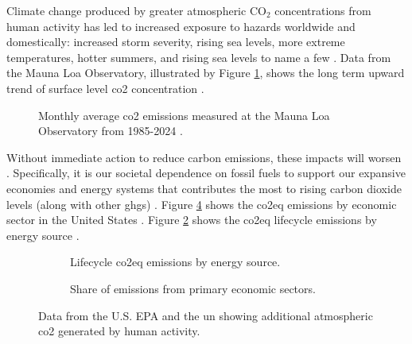Climate change produced by greater atmospheric CO$_2$ concentrations
\cite{kane_atmospheric_1996} from human activity has led to increased exposure
to hazards worldwide and domestically: increased storm severity, rising sea
levels, more extreme temperatures, hotter summers, and rising sea levels to name
a few \cite{reidmiller_fourth_2018}. Data from the Mauna Loa Observatory,
illustrated by Figure \ref{fig:mauna-loa-co2}, shows the long term upward trend
of surface level \ac{co2} concentration \cite{kane_atmospheric_1996}.
\begin{figure}[ht!]
    \centering
    \resizebox{0.9\columnwidth}{!}{}
    \caption{Monthly average \ac{co2} emissions measured at the Mauna Loa
    Observatory from 1985-2024 \cite{kane_atmospheric_1996}.}
    \label{fig:mauna-loa-co2}
\end{figure}

Without immediate action to reduce carbon emissions, these impacts will worsen
\cite{intergovernmental_panel_on_climate_change_climate_2014}. Specifically, it
is our societal dependence on fossil fuels to support our expansive economies
and energy systems that contributes the most to rising carbon dioxide levels
(along with other \acp{ghg}) \cite{epa_inventory_2023}. Figure
\ref{fig:emissions-by-sector} shows the \ac{co2eq} emissions by economic sector
in the United States \cite{epa_inventory_2023}. Figure
\ref{fig:emissions-by-source} shows the \ac{co2eq} lifecycle emissions by energy
source \cite{united_nations_economic_commission_for_europe_carbon_2022}. 

\begin{figure}[ht!]
    \centering
    \begin{subfigure}{0.7\columnwidth}
        \centering
        \resizebox{\textwidth}{!}{}
        \caption{Lifecycle \ac{co2eq} emissions by energy source.}
        \label{fig:emissions-by-source}
    \end{subfigure}
    \begin{subfigure}{0.7\columnwidth}
        \centering
        \resizebox{\textwidth}{!}{}
        \caption{Share of emissions from primary economic sectors.}
        \label{fig:emissions-by-sector}
    \end{subfigure}
    \caption{Data from the U.S. EPA and the \ac{un} showing additional
    atmospheric \ac{co2} generated by human activity.}
\end{figure}
\FloatBarrier

